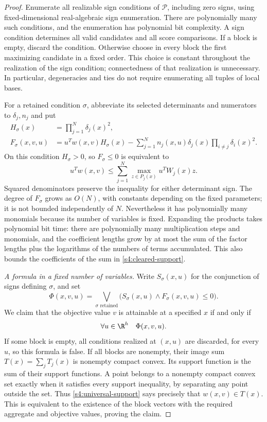 \begin{proof}
Enumerate all realizable sign conditions of $\mathcal P$, including
zero signs, using fixed-dimensional real-algebraic sign enumeration.
There are polynomially many such conditions, and the enumeration has
polynomial bit complexity. A sign condition determines all valid
candidates and all score comparisons. If a block is empty, discard
the condition. Otherwise choose in every block the first maximizing
candidate in a fixed order. This choice is constant throughout the
realization of the sign condition; connectedness of that realization
is unnecessary. In particular, degeneracies and ties do not require
enumerating all tuples of local bases.

For a retained condition $\sigma$, abbreviate its selected determinants
and numerators to $\delta_j,n_j$ and put
\begin{align}
 H_\sigma(x)&=\prod_{j=1}^N\delta_j(x)^2,\\
 F_\sigma(x,v,u)&=u^Tw(x,v)H_\sigma(x)
 -\sum_{j=1}^N n_j(x,u)\delta_j(x)
                         \prod_{i\ne j}\delta_i(x)^2.
 \label{s4:cleared-support}
\end{align}
On this condition $H_\sigma>0$, so $F_\sigma\le0$ is equivalent to
\begin{equation}
 u^Tw(x,v)\le\sum_{j=1}^N
                   \max_{z\in P_j(x)}u^TW_j(x)z.
 \label{s4:support-inequality}
\end{equation}
Squared denominators preserve the inequality for either determinant
sign. The degree of $F_\sigma$ grows as $O(N)$, with constants depending
on the fixed parameters; it is not bounded independently of $N$.
Nevertheless it has polynomially many monomials because its number of
variables is fixed. Expanding the products takes polynomial bit time:
there are polynomially many multiplication steps and monomials, and
the coefficient lengths grow by at most the sum of the factor lengths
plus the logarithms of the numbers of terms accumulated. This also
bounds the coefficients of the sum in \eqref{s4:cleared-support}.

\emph{A formula in a fixed number of variables.}
Write $S_\sigma(x,u)$ for the conjunction of signs defining $\sigma$,
and set
\[
 \Phi(x,v,u)=\bigvee_{\sigma\text{ retained}}
           \bigl(S_\sigma(x,u)\wedge F_\sigma(x,v,u)\le0\bigr).
\]
We claim that the objective value $v$ is attainable at a specified
$x$ if and only if
\begin{equation}
 \forall u\in\R^h\quad\Phi(x,v,u).
 \label{s4:universal-support}
\end{equation}
If some block is empty, all conditions realized at $(x,u)$ are
discarded, for every $u$, so this formula is false. If all blocks are
nonempty, their image sum $T(x)=\sum_jT_j(x)$ is nonempty compact
convex. Its support function is the sum of their support functions.
A point belongs to a nonempty compact convex set exactly when it
satisfies every support inequality, by separating any point outside
the set. Thus \eqref{s4:universal-support} says precisely that
$w(x,v)\in T(x)$. This is equivalent to the existence of the block
vectors with the required aggregate and objective values, proving
the claim.


\end{proof}
